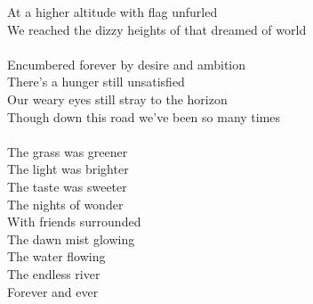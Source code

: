At a higher altitude with flag unfurled \\
We reached the dizzy heights of that dreamed of world\\
\\
Encumbered forever by desire and ambition \\
There's a hunger still unsatisfied \\
Our weary eyes still stray to the horizon \\
Though down this road we've been so many times\\
\\
The grass was greener \\
The light was brighter \\
The taste was sweeter \\
The nights of wonder \\
With friends surrounded \\
The dawn mist glowing \\
The water flowing \\
The endless river\\
Forever and ever\\
\newpage


